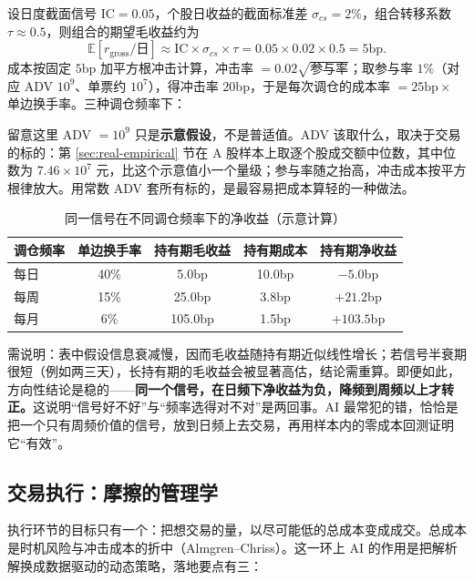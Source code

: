 设日度截面信号 IC$=0.05$，个股日收益的截面标准差 $\sigma_{cs}=2\%$，组合转移系数 $\tau\approx0.5$，则组合的期望毛收益约为
\begin{equation}
  \mathbb{E}[r_{\text{gross}}/\text{日}] \approx \text{IC}\times\sigma_{cs}\times\tau = 0.05\times0.02\times0.5 = 5\text{bp}.
\end{equation}
成本按固定 $5$bp 加平方根冲击计算，冲击率 $=0.02\sqrt{\text{参与率}}$；取参与率 $1\%$（对应 ADV $10^9$、单票约 $10^7$），得冲击率 $20$bp，于是每次调仓的成本率 $=25\text{bp}\times$ 单边换手率。三种调仓频率下：

留意这里 ADV $=10^9$ 只是\textbf{示意假设}，不是普适值。ADV 该取什么，取决于交易的标的：第 \ref{sec:real-empirical} 节在 A 股样本上取逐个股成交额中位数，其中位数为 $7.46\times10^7$ 元，比这个示意值小一个量级；参与率随之抬高，冲击成本按平方根律放大。用常数 ADV 套所有标的，是最容易把成本算轻的一种做法。

\begin{table}[htbp]
\centering
\caption{同一信号在不同调仓频率下的净收益（示意计算）}
\label{tab:costsplit}
\begin{tabular}{@{}lcccc@{}}
\toprule
调仓频率 & 单边换手率 & 持有期毛收益 & 持有期成本 & 持有期净收益 \\
\midrule
每日 & 40\% & 5.0bp & 10.0bp & $-5.0$bp \\
每周 & 15\% & 25.0bp & 3.8bp & $+21.2$bp \\
每月 & 6\% & 105.0bp & 1.5bp & $+103.5$bp \\
\bottomrule
\end{tabular}
\end{table}

\noindent 需说明：表中假设信息衰减慢，因而毛收益随持有期近似线性增长；若信号半衰期很短（例如两三天），长持有期的毛收益会被显著高估，结论需重算。即便如此，方向性结论是稳的——\textbf{同一个信号，在日频下净收益为负，降频到周频以上才转正。}这说明“信号好不好”与“频率选得对不对”是两回事。AI 最常犯的错，恰恰是把一个只有周频价值的信号，放到日频上去交易，再用样本内的零成本回测证明它“有效”。

\subsection{交易执行：摩擦的管理学}

执行环节的目标只有一个：把想交易的量，以尽可能低的总成本变成成交。总成本是时机风险与冲击成本的折中（Almgren--Chriss\cite{almgrenchriss2000}）。这一环上 AI 的作用是把解析解换成数据驱动的动态策略，落地要点有三：

